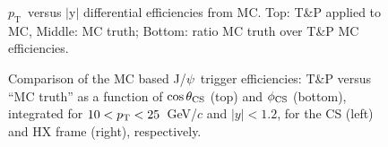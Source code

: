 \documentclass[12pt]{article}
\newcommand{\pt}{$p_{\mathrm{T}}$}
\newcommand{\jpsi}{J/$\psi$}
\begin{document}
\begin{figure}[htbp]
\centering
{}
\caption{\pt\ versus $|$y$|$ differential efficiencies
  from MC. Top: T\&P applied to MC, Middle: MC truth; Bottom: ratio
  MC truth over T\&P MC efficiencies.}
\end{figure}


\begin{figure}[htbp]
\centering
{}
\caption{Comparison of the MC based \jpsi\ trigger efficiencies: T\&P
  versus ``MC truth'' as a function of $\cos\theta_{\rm CS}$ (top) and
  $\phi_{\rm CS}$ (bottom), integrated for $10 < p_{\rm T} <
  25$~GeV/$c$ and  $|y| < 1.2$, for the CS (left) and HX frame (right), respectively.} 
\end{figure}
\end{document}
